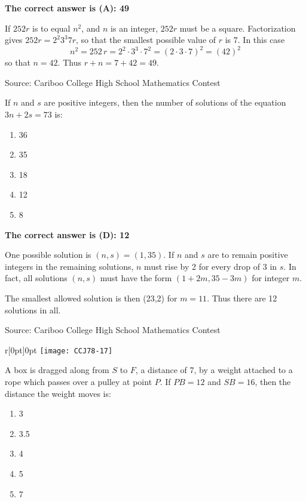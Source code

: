 \documentclass{article}
\begin{document}
\textbf{The correct answer is (A): 49}

If $252r$ is to equal $n^2$, and $n$ is an integer, $252r$ must be a square. Factorization gives $252r = 2^2 3^3 7r$, so that the smallest possible value of $r$ is 7. In this case
\[
n^2 = 252\,r = 2^2\cdot3^3\cdot7^2 = (2 \cdot 3 \cdot 7)^2 = (42)^2
\]
so that $n=42$. Thus $r+n = 7+42 = 49$.

\vskip 1.5cm


\scriptsize
Source: Cariboo College High School Mathematics Contest

\normalsize
If $n$ and $s$ are positive integers, then the number of solutions of the equation $3n+2s=73$ is:
\begin{enumerate}[noitemsep,topsep=0mm,leftmargin=*,widest=D,label=\Alph*)]
	\item 36
	\item 35
	\item 18
	\item 12
	\item 8
\end{enumerate}

\textbf{The correct answer is (D): 12}

One possible solution is $(n,s)=(1,35)$. If $n$ and $s$ are to remain positive integers in the remaining solutions, $n$ must rise by 2 for every drop of 3 in $s$. In fact, all solutions $(n,s)$ must have the form $(1+2m,35-3m)$ for integer $m$.

The smallest allowed solution is then (23,2) for $m=11$. Thus there are 12 solutions in all.

\vskip 1.5cm


\scriptsize
Source: Cariboo College High School Mathematics Contest

\normalsize
\begin{wrapfigure}{r}[0pt]{0pt}
	\texttt{[image: CCJ78-17]}
\end{wrapfigure}
A box is dragged along from $S$ to $F$, a distance of 7, by a weight attached to a rope which passes over a pulley at point $P$. If $PB = 12$ and $SB=16$, then the distance the weight moves is:
\begin{enumerate}[noitemsep,topsep=0mm,leftmargin=*,widest=D,label=\Alph*)]
	\item 3
	\item 3.5
	\item 4
	\item 5
	\item 7
\end{enumerate}
\end{document}
